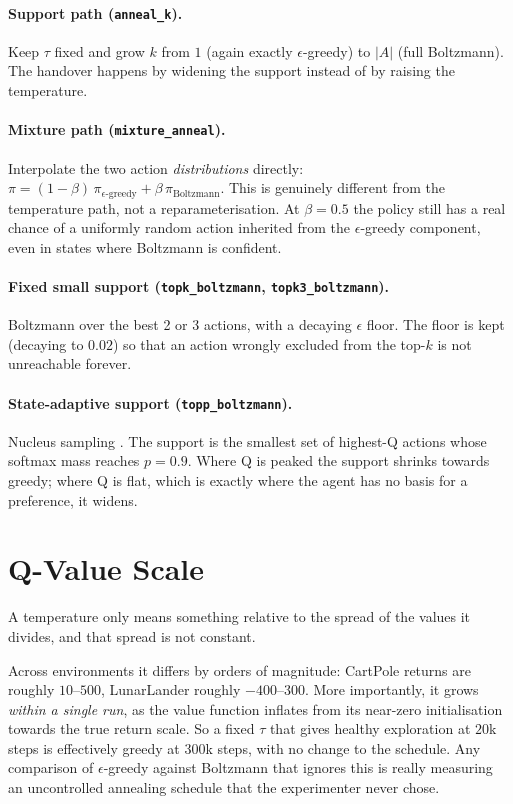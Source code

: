 \documentclass[11pt,a4paper]{article}
\begin{document}
\paragraph{Support path (\texttt{anneal\_k}).}
Keep $\tau$ fixed and grow $k$ from $1$ (again exactly $\epsilon$-greedy) to
$|A|$ (full Boltzmann). The handover happens by widening the support instead of
by raising the temperature.

\paragraph{Mixture path (\texttt{mixture\_anneal}).}
Interpolate the two action \emph{distributions} directly:
$\pi = (1-\beta)\,\pi_{\epsilon\text{-greedy}} + \beta\,\pi_{\text{Boltzmann}}$.
This is genuinely different from the temperature path, not a reparameterisation.
At $\beta = 0.5$ the policy still has a real chance of a uniformly random
action inherited from the $\epsilon$-greedy component, even in states where
Boltzmann is confident.

\paragraph{Fixed small support (\texttt{topk\_boltzmann}, \texttt{topk3\_boltzmann}).}
Boltzmann over the best 2 or 3 actions, with a decaying $\epsilon$ floor. The
floor is kept (decaying to $0.02$) so that an action wrongly excluded from the
top-$k$ is not unreachable forever.

\paragraph{State-adaptive support (\texttt{topp\_boltzmann}).}
Nucleus sampling \cite{holtzman2020}. The support is the smallest set of
highest-Q actions whose softmax mass reaches $p = 0.9$. Where Q is peaked the
support shrinks towards greedy; where Q is flat, which is exactly where the
agent has no basis for a preference, it widens.

\section{Q-Value Scale}
\label{sec:scale}

A temperature only means something relative to the spread of the values it
divides, and that spread is not constant.

Across environments it differs by orders of magnitude: CartPole returns are
roughly $10$--$500$, LunarLander roughly $-400$--$300$. More importantly, it
grows \emph{within a single run}, as the value function inflates from its
near-zero initialisation towards the true return scale. So a fixed $\tau$ that
gives healthy exploration at $20$k steps is effectively greedy at $300$k steps,
with no change to the schedule. Any comparison of $\epsilon$-greedy against
Boltzmann that ignores this is really measuring an uncontrolled annealing
schedule that the experimenter never chose.
\end{document}
